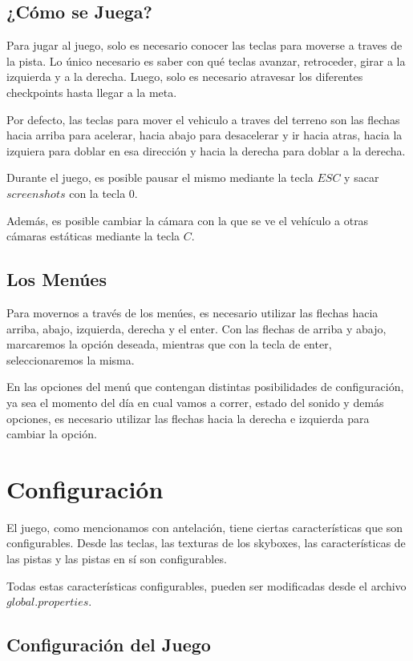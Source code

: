\documentclass[a4paper,10pt]{article}
\begin{document}
\subsection{¿C\'omo se Juega?}
Para jugar al juego, solo es necesario conocer las teclas para moverse a traves
de la pista.  Lo \'unico necesario es saber con qu\'e teclas avanzar,
retroceder,
girar a la izquierda y a la derecha.  Luego, solo es necesario atravesar los
diferentes checkpoints hasta llegar a la meta.

Por defecto, las teclas para mover el vehiculo a traves del terreno son las
flechas hacia arriba para acelerar, hacia abajo para desacelerar y ir hacia
atras, hacia la izquiera para doblar en esa direcci\'on y hacia la derecha para
doblar a la derecha.

Durante el juego, es posible pausar el mismo mediante la tecla $ESC$ y sacar
$screenshots$ con la tecla $0$.

Adem\'as, es posible cambiar la c\'amara con la que se ve el veh\'iculo a otras
c\'amaras est\'aticas mediante la tecla $C$.

\subsection{Los Men\'ues}
Para movernos a trav\'es de los men\'ues, es necesario utilizar las flechas
hacia
arriba, abajo, izquierda, derecha y el enter.  Con las flechas de arriba y
abajo, marcaremos la opci\'on deseada, mientras que con la tecla de enter,
seleccionaremos la misma.

En las opciones del men\'u que contengan distintas posibilidades de
configuraci\'on, ya sea el momento del d\'ia en cual vamos a correr, estado del
sonido y dem\'as opciones, es necesario utilizar las flechas hacia la derecha e
izquierda para cambiar la opci\'on.
\section{Configuraci\'on}
\label{configuracion}
El juego, como mencionamos con antelaci\'on, tiene ciertas caracter\'isticas
que
son configurables.  Desde las teclas, las texturas de los skyboxes, las
caracter\'isticas de las pistas y las pistas en s\'i son configurables.

Todas estas caracter\'isticas configurables, pueden ser modificadas desde el
archivo $global.properties$.

\subsection{Configuraci\'on del Juego}
\end{document}
